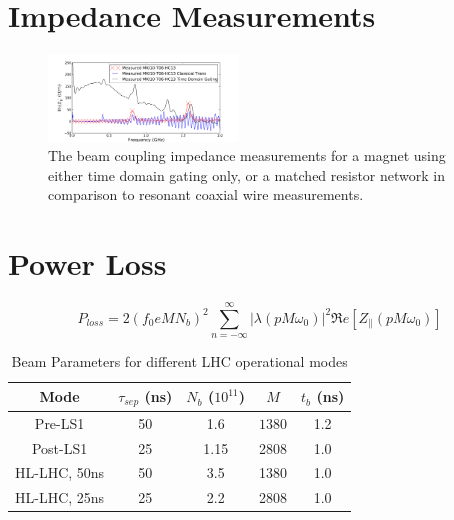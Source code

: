 \documentclass[a4paper,
              ]{jacow}
\begin{document}
\section{Impedance Measurements}



\begin{figure}
\includegraphics[width=0.45\textwidth]{compMeasurementGating.pdf}
\caption{The beam coupling impedance measurements for a magnet using either time domain gating only, or a matched resistor network in comparison to resonant coaxial wire measurements.}
\label{fig:measComp}
\end{figure}

\section{Power Loss}



\begin{equation}
P_{loss} = 2 \left( f_{0} e M  N_{b}\right)^{2} \displaystyle\sum\limits_{n = -\infty}^{\infty}  \left| \lambda \left( p M \omega_{0} \right)  \right|^{2} \Re{}e \left[ Z_{\parallel} \left( p M \omega_{0} \right) \right]
\label{eqn:powLoss}
\end{equation}


\begin{table}
\caption{Beam Parameters for different LHC operational modes}
\label{tab:beamPara}
\begin{center}
\begin{tabular}{c | c | c | c | c}
Mode & $\tau_{sep}$ (ns) & $N_{b}$ ($10^{11}$) & $ M $ & $t_{b}$ (ns) \\ \hline 
Pre-LS1 & 50 & 1.6 & $ 1380 $ & 1.2 \\ \hline 
Post-LS1 & 25 & 1.15 & 2808 & 1.0 \\ \hline 
HL-LHC, 50ns & 50 & 3.5 & 1380 & 1.0 \\ \hline 
HL-LHC, 25ns & 25 & 2.2 & 2808 & 1.0 \\ 
\end{tabular}
\end{center}
\end{table}
\end{document}
